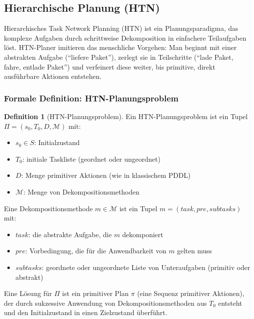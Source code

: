 ﻿\documentclass[a4paper,12pt]{article}
\theoremstyle{definition}
\newtheorem{definition}{Definition}[section]
\begin{document}
\subsection{Hierarchische Planung (HTN)}

Hierarchisches Task Network Planning (HTN) \cite{erol1994} ist ein Planungsparadigma, das komplexe Aufgaben durch schrittweise Dekomposition in einfachere Teilaufgaben löst. HTN-Planer imitieren das menschliche Vorgehen: Man beginnt mit einer abstrakten Aufgabe (``liefere Paket''), zerlegt sie in Teilschritte (``lade Paket, fahre, entlade Paket'') und verfeinert diese weiter, bis primitive, direkt ausführbare Aktionen entstehen.

\subsubsection{Formale Definition: HTN-Planungsproblem}

\begin{definition}[HTN-Planungsproblem]
Ein HTN-Planungsproblem ist ein Tupel $\Pi = (s_0, T_0, D, \mathcal{M})$ mit:
\begin{itemize}
  \item[-] $s_0 \in S$: Initialzustand
  \item[-] $T_0$: initiale Taskliste (geordnet oder ungeordnet)
  \item[-] $D$: Menge primitiver Aktionen (wie in klassischem PDDL)
  \item[-] $\mathcal{M}$: Menge von Dekompositionsmethoden
\end{itemize}
Eine Dekompositionsmethode $m \in \mathcal{M}$ ist ein Tupel $m = (\mathit{task}, \mathit{pre}, \mathit{subtasks})$ mit:
\begin{itemize}
  \item[-] $\mathit{task}$: die abstrakte Aufgabe, die $m$ dekomponiert
  \item[-] $\mathit{pre}$: Vorbedingung, die für die Anwendbarkeit von $m$ gelten muss
  \item[-] $\mathit{subtasks}$: geordnete oder ungeordnete Liste von Unteraufgaben (primitiv oder abstrakt)
\end{itemize}
\end{definition}

Eine Lösung für $\Pi$ ist ein primitiver Plan $\pi$ (eine Sequenz primitiver Aktionen), der durch sukzessive Anwendung von Dekompositionsmethoden aus $T_0$ entsteht und den Initialzustand in einen Zielzustand überführt.
\end{document}
